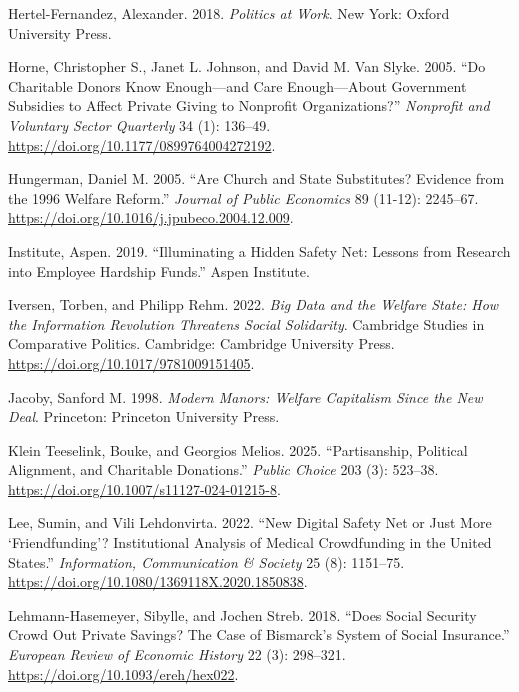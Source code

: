 \documentclass[
  11pt,
  oneside]{article}
\newlength{\cslhangindent}
\newenvironment{CSLReferences}[2] %
 {\begin{list}{}{%
  \setlength{\itemindent}{0pt}
  \setlength{\leftmargin}{0pt}
  \setlength{\parsep}{0pt}
  \ifodd #1
   \setlength{\leftmargin}{\cslhangindent}
   \setlength{\itemindent}{-1\cslhangindent}
  \fi
  \setlength{\itemsep}{#2\baselineskip}}}
 {\end{list}}
\begin{document}
\begin{CSLReferences}{1}{0}
Hertel-Fernandez, Alexander. 2018. \emph{Politics at {Work}}. New York: Oxford University Press.

Horne, Christopher S., Janet L. Johnson, and David M. Van Slyke. 2005. {``Do {Charitable Donors Know Enough}---and {Care Enough}---{About Government Subsidies} to {Affect Private Giving} to {Nonprofit Organizations}?''} \emph{Nonprofit and Voluntary Sector Quarterly} 34 (1): 136--49. \url{https://doi.org/10.1177/0899764004272192}.

Hungerman, Daniel M. 2005. {``Are Church and State Substitutes? {Evidence} from the 1996 Welfare Reform.''} \emph{Journal of Public Economics} 89 (11-12): 2245--67. \url{https://doi.org/10.1016/j.jpubeco.2004.12.009}.

Institute, Aspen. 2019. {``Illuminating a {Hidden Safety Net}: {Lessons} from {Research} into {Employee Hardship Funds}.''} Aspen Institute.

Iversen, Torben, and Philipp Rehm. 2022. \emph{Big {Data} and the {Welfare State}: {How} the {Information Revolution Threatens Social Solidarity}}. Cambridge {Studies} in {Comparative Politics}. Cambridge: Cambridge University Press. \url{https://doi.org/10.1017/9781009151405}.

Jacoby, Sanford M. 1998. \emph{Modern {Manors}: {Welfare Capitalism} Since the {New Deal}}. Princeton: Princeton University Press.

Klein Teeselink, Bouke, and Georgios Melios. 2025. {``Partisanship, Political Alignment, and Charitable Donations.''} \emph{Public Choice} 203 (3): 523--38. \url{https://doi.org/10.1007/s11127-024-01215-8}.

Lee, Sumin, and Vili Lehdonvirta. 2022. {``New Digital Safety Net or Just More {`Friendfunding'}? {Institutional} Analysis of Medical Crowdfunding in the {United States}.''} \emph{Information, Communication \& Society} 25 (8): 1151--75. \url{https://doi.org/10.1080/1369118X.2020.1850838}.

Lehmann-Hasemeyer, Sibylle, and Jochen Streb. 2018. {``Does {Social Security Crowd Out Private Savings}? {The Case} of {Bismarck}'s {System} of {Social Insurance}.''} \emph{European Review of Economic History} 22 (3): 298--321. \url{https://doi.org/10.1093/ereh/hex022}.


\end{CSLReferences}
\end{document}
